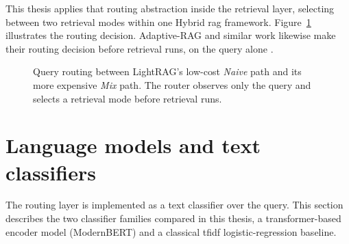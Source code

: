 \documentclass[english, bibtex]{kththesis}               %
\numberwithin{listing}{chapter}
\begin{document}
This thesis applies that routing abstraction inside the retrieval layer, selecting between two retrieval modes within one Hybrid \gls{rag} framework. Figure~\ref{fig:retrievalModeRouting} illustrates the routing decision. Adaptive-RAG and similar work likewise make their routing decision before retrieval runs, on the query alone \cite{jeong2024adaptiverag,hu2024routerbench}.

\begin{figure}[!ht]
\centering
{}
\caption{Query routing between LightRAG's low-cost \emph{Naive} path and its more expensive \emph{Mix} path. The router observes only the query and selects a retrieval mode before retrieval runs.}
\label{fig:retrievalModeRouting}
\end{figure}

\section{Language models and text classifiers}
\label{sec:backgroundEncoderClassifiers}

The routing layer is implemented as a text classifier over the query. This section describes the two classifier families compared in this thesis, a transformer-based encoder model (ModernBERT) and a classical \gls{tfidf} logistic-regression baseline.
\end{document}
